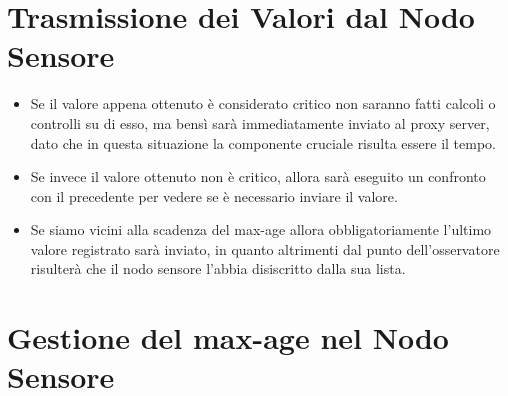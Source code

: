   \section{Trasmissione dei Valori dal Nodo Sensore}

    \begin{itemize}
      \item Se il valore appena ottenuto è considerato critico non saranno fatti calcoli o controlli su di esso, ma bensì sarà immediatamente inviato al proxy server, dato che in questa situazione la componente cruciale risulta essere il tempo.
      \item Se invece il valore ottenuto non è critico, allora sarà eseguito un confronto con il precedente per vedere se è necessario inviare il valore.
      \item Se siamo vicini alla scadenza del max-age allora obbligatoriamente l’ultimo valore registrato sarà inviato, in quanto altrimenti dal punto dell’osservatore risulterà che il nodo sensore l’abbia disiscritto dalla sua lista.
    \end{itemize}

  \section{Gestione del max-age nel Nodo Sensore}

